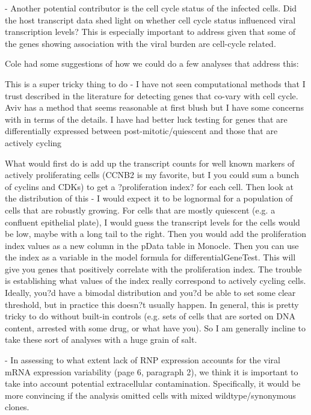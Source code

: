 \documentclass[11pt, oneside]{article}   	%
\begin{document}
- Another potential contributor is the cell cycle status of the infected cells. Did the host transcript data shed light on whether cell cycle status influenced viral transcription levels? This is especially important to address given that some of the genes showing association with the viral burden are cell-cycle related. 

{\color{red}
Cole had some suggestions of how we could do a few analyses that address this:

This is a super tricky thing to do - I have not seen computational methods that I trust described in the literature for detecting genes that co-vary with cell cycle. Aviv has a method that seems reasonable at first blush but I have some concerns with in terms of the details.
I have had better luck testing for genes that are differentially expressed between post-mitotic/quiescent and those that are actively cycling

What would first do is add up the transcript counts for well known markers of actively proliferating cells (CCNB2 is my favorite, but I you could sum a bunch of cyclins and CDKs) to get a ?proliferation index? for each cell. Then look at the distribution of this - I would expect it to be lognormal for a population of cells that are robustly growing. For cells that are mostly quiescent (e.g. a confluent epithelial plate), I would guess the transcript levels for the cells would be low, maybe with a long tail to the right. Then you would add the proliferation index values as a new column in the pData table in Monocle. Then you can use the index as a variable in the model formula for differentialGeneTest. This will give you genes that positively correlate with the proliferation index.
The trouble is establishing what values of the index really correspond to actively cycling cells. Ideally, you?d have a bimodal distribution and you?d be able to set some clear threshold, but in practice this doesn?t usually happen. In general, this is pretty tricky to do without built-in controls (e.g. sets of cells that are sorted on DNA content, arrested with some drug, or what have you).
So I am generally incline to take these sort of analyses with a huge grain of salt.
}

- In assessing to what extent lack of RNP expression accounts for the viral mRNA expression variability (page 6, paragraph 2), we think it is important to take into account potential extracellular contamination. Specifically, it would be more convincing if the analysis omitted cells with mixed wildtype/synonymous clones. 
\end{document}
